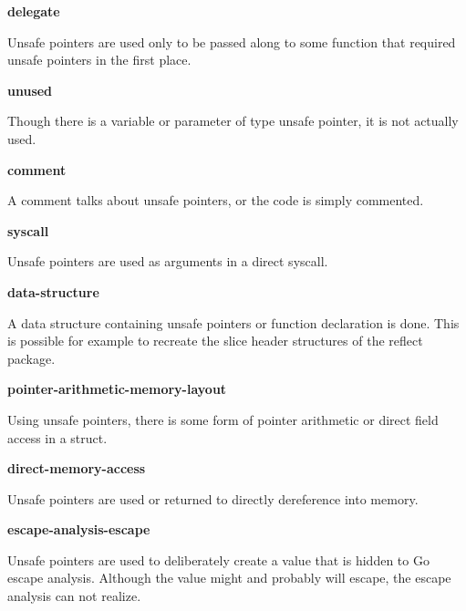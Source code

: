 


\textbf{delegate}

Unsafe pointers are used only to be passed along to some function that required unsafe pointers in the first place.




\textbf{unused}

Though there is a variable or parameter of type unsafe pointer, it is not actually used.




\textbf{comment}

A comment talks about unsafe pointers, or the code is simply commented.




\textbf{syscall}

Unsafe pointers are used as arguments in a direct syscall.




\textbf{data-structure}

A data structure containing unsafe pointers or function declaration is done.
This is possible for example to recreate the slice header structures of the reflect package.




\textbf{pointer-arithmetic-memory-layout}

Using unsafe pointers, there is some form of pointer arithmetic or direct field access in a struct.




\textbf{direct-memory-access}

Unsafe pointers are used or returned to directly dereference into memory.




\textbf{escape-analysis-escape}

Unsafe pointers are used to deliberately create a value that is hidden to Go escape analysis.
Although the value might and probably will escape, the escape analysis can not realize.

